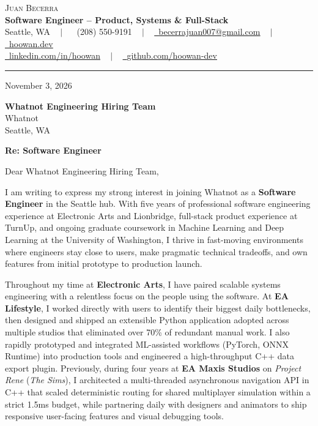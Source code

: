 \documentclass[letterpaper,11pt]{article}
\begin{document}
\begin{center}
    {\Huge \scshape Juan Becerra} \\ \vspace{4pt}
    \textbf{\large Software Engineer -- Product, Systems \& Full-Stack} \\ \vspace{4pt}
    \small Seattle, WA ~ $|$ ~
    \raisebox{-0.1\height}\faPhone\ (208) 550-9191 ~ $|$ ~
    \href{mailto:becerrajuan007@gmail.com}{\raisebox{-0.2\height}\faEnvelope\ \underline{becerrajuan007@gmail.com}} ~ $|$ ~
    \href{https://hoowan.dev}{\raisebox{-0.2\height}\faGlobe\ \underline{hoowan.dev}} \\ \vspace{2pt}
    \href{https://linkedin.com/in/hoowan/}{\raisebox{-0.2\height}\faLinkedin\ \underline{linkedin.com/in/hoowan}} ~ $|$ ~
    \href{https://github.com/hoowan-dev}{\raisebox{-0.2\height}\faGithub\ \underline{github.com/hoowan-dev}}
\end{center}

\vspace{4pt}
\hrule
\vspace{14pt}

\noindent November 3, 2026

\vspace{8pt}
\noindent \textbf{Whatnot Engineering Hiring Team} \\
Whatnot \\
Seattle, WA

\vspace{8pt}
\noindent \textbf{Re: Software Engineer}

\vspace{8pt}
\noindent Dear Whatnot Engineering Hiring Team,

I am writing to express my strong interest in joining Whatnot as a \textbf{Software Engineer} in the Seattle
hub. With five years of professional software engineering experience at Electronic Arts and Lionbridge,
full-stack product experience at TurnUp, and ongoing graduate coursework in Machine Learning and Deep
Learning at the University of Washington, I thrive in fast-moving environments where engineers stay close to
users, make pragmatic technical tradeoffs, and own features from initial prototype to production launch.

Throughout my time at \textbf{Electronic Arts}, I have paired scalable systems engineering with a relentless
focus on the people using the software. At \textbf{EA Lifestyle}, I worked directly with users to identify
their biggest daily bottlenecks, then designed and shipped an extensible Python application adopted across
multiple studios that eliminated over 70\% of redundant manual work. I also rapidly prototyped and integrated
ML-assisted workflows (PyTorch, ONNX Runtime) into production tools and engineered a high-throughput C++
data export plugin. Previously, during four years at \textbf{EA Maxis Studios} on \emph{Project Rene}
(\emph{The Sims}), I architected a multi-threaded asynchronous navigation API in C++ that scaled deterministic
routing for shared multiplayer simulation within a strict 1.5ms budget, while partnering daily with designers
and animators to ship responsive user-facing features and visual debugging tools.
\end{document}
